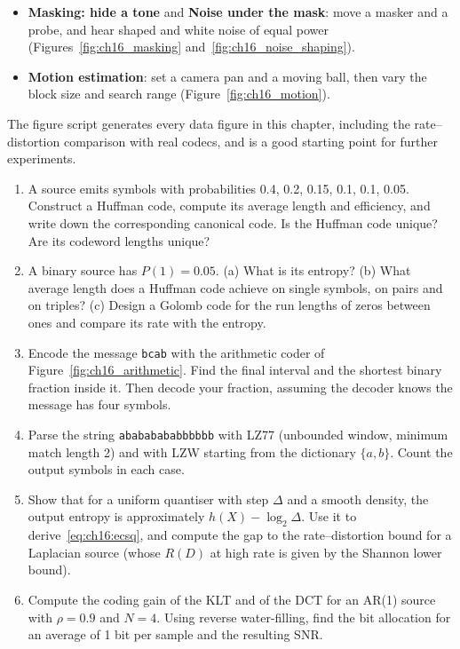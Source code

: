 \begin{labbox}
\begin{itemize}
\item \textbf{Masking: hide a tone} and \textbf{Noise under the mask}: move a masker and a probe, and hear
shaped and white noise of equal power (Figures~\ref{fig:ch16_masking} and~\ref{fig:ch16_noise_shaping}).
\item \textbf{Motion estimation}: set a camera pan and a moving ball, then vary the block size and search
range (Figure~\ref{fig:ch16_motion}).
\end{itemize}
The figure script  generates every data figure in this chapter,
including the rate--distortion comparison with real codecs, and is a good starting point for further
experiments.
\end{labbox}

\problems
\begin{enumerate}[label=\thechapter.\arabic*]
\item A source emits symbols with probabilities 0.4, 0.2, 0.15, 0.1, 0.1, 0.05. Construct a Huffman code,
compute its average length and efficiency, and write down the corresponding canonical code. Is the Huffman
code unique? Are its codeword lengths unique?
\item A binary source has $P(1)=0.05$. (a) What is its entropy? (b) What average length does a Huffman code
achieve on single symbols, on pairs and on triples? (c) Design a Golomb code for the run lengths of zeros
between ones and compare its rate with the entropy.
\item Encode the message \texttt{bcab} with the arithmetic coder of Figure~\ref{fig:ch16_arithmetic}. Find the
final interval and the shortest binary fraction inside it. Then decode your fraction, assuming the decoder
knows the message has four symbols.
\item Parse the string \texttt{abababababbbbbb} with LZ77 (unbounded window, minimum match length 2) and with
LZW starting from the dictionary $\{a,b\}$. Count the output symbols in each case.
\item Show that for a uniform quantiser with step $\Delta$ and a smooth density, the output entropy is
approximately $h(X)-\log_2\Delta$. Use it to derive~\eqref{eq:ch16:ecsq}, and compute the gap to the
rate--distortion bound for a Laplacian source (whose $R(D)$ at high rate is given by the Shannon lower bound).
\item Compute the coding gain of the KLT and of the DCT for an AR(1) source with $\rho=0.9$ and $N=4$. Using
reverse water-filling, find the bit allocation for an average of 1 bit per sample and the resulting SNR.

\end{enumerate}
